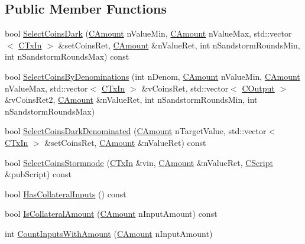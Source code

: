 \subsection*{Public Member Functions}
\begin{DoxyCompactItemize}
\item 
bool \hyperlink{class_c_wallet_a260d40c79106bbaabbf3f4aaf328ffbc}{Select\+Coins\+Dark} (\hyperlink{amount_8h_a4eaf3a5239714d8c45b851527f7cb564}{C\+Amount} n\+Value\+Min, \hyperlink{amount_8h_a4eaf3a5239714d8c45b851527f7cb564}{C\+Amount} n\+Value\+Max, std\+::vector$<$ \hyperlink{class_c_tx_in}{C\+Tx\+In} $>$ \&set\+Coins\+Ret, \hyperlink{amount_8h_a4eaf3a5239714d8c45b851527f7cb564}{C\+Amount} \&n\+Value\+Ret, int n\+Sandstorm\+Rounds\+Min, int n\+Sandstorm\+Rounds\+Max) const 
\item 
bool \hyperlink{class_c_wallet_aa7606e8da251a609bf5d89a138f5d12e}{Select\+Coins\+By\+Denominations} (int n\+Denom, \hyperlink{amount_8h_a4eaf3a5239714d8c45b851527f7cb564}{C\+Amount} n\+Value\+Min, \hyperlink{amount_8h_a4eaf3a5239714d8c45b851527f7cb564}{C\+Amount} n\+Value\+Max, std\+::vector$<$ \hyperlink{class_c_tx_in}{C\+Tx\+In} $>$ \&v\+Coins\+Ret, std\+::vector$<$ \hyperlink{class_c_output}{C\+Output} $>$ \&v\+Coins\+Ret2, \hyperlink{amount_8h_a4eaf3a5239714d8c45b851527f7cb564}{C\+Amount} \&n\+Value\+Ret, int n\+Sandstorm\+Rounds\+Min, int n\+Sandstorm\+Rounds\+Max)
\item 
bool \hyperlink{class_c_wallet_a24db5f86820fc83577b09cabbed7a571}{Select\+Coins\+Dark\+Denominated} (\hyperlink{amount_8h_a4eaf3a5239714d8c45b851527f7cb564}{C\+Amount} n\+Target\+Value, std\+::vector$<$ \hyperlink{class_c_tx_in}{C\+Tx\+In} $>$ \&set\+Coins\+Ret, \hyperlink{amount_8h_a4eaf3a5239714d8c45b851527f7cb564}{C\+Amount} \&n\+Value\+Ret) const 
\item 
bool \hyperlink{class_c_wallet_aa9de562860088e12fdf6b812e59019e3}{Select\+Coins\+Stormnode} (\hyperlink{class_c_tx_in}{C\+Tx\+In} \&vin, \hyperlink{amount_8h_a4eaf3a5239714d8c45b851527f7cb564}{C\+Amount} \&n\+Value\+Ret, \hyperlink{class_c_script}{C\+Script} \&pub\+Script) const 
\item 
bool \hyperlink{class_c_wallet_a52e57716466339e8ba1159486b172734}{Has\+Collateral\+Inputs} () const 
\item 
bool \hyperlink{class_c_wallet_a97dd6ac6a62ff915a42dacbd0fe9337d}{Is\+Collateral\+Amount} (\hyperlink{amount_8h_a4eaf3a5239714d8c45b851527f7cb564}{C\+Amount} n\+Input\+Amount) const 
\item 
int \hyperlink{class_c_wallet_a6ab79abf1aba845254fe5969731ba2ad}{Count\+Inputs\+With\+Amount} (\hyperlink{amount_8h_a4eaf3a5239714d8c45b851527f7cb564}{C\+Amount} n\+Input\+Amount)

\end{DoxyCompactItemize}
